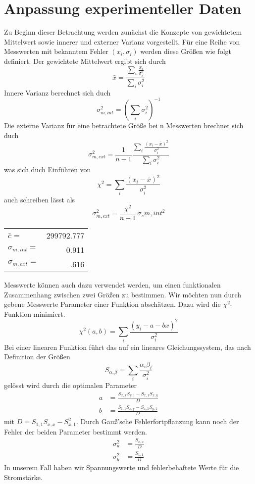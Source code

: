 \documentclass[12pt]{article}
\begin{document}
\section{Anpassung experimenteller Daten}
Zu Beginn dieser Betrachtung werden zunächst die Konzepte von gewichtetem Mittelwert sowie innerer und externer Varianz vorgestellt. Für eine Reihe von Messwerten mit bekanntem Fehler $(x_i,\sigma_i)$ werden diese Größen wie folgt definiert.
Der gewichtete Mittelwert ergibt sich durch
$$\bar{x}=\frac{\sum_i\frac{x_i}{\sigma_i^2}}{\sum_i\sigma_i^2}$$
Innere Varianz berechnet sich duch
$$\sigma_{m,int}^2=(\sum_i\sigma_i^2)^{-1}$$
Die externe Varianz für eine betrachtete Größe bei n Messwerten brechnet sich duch
$$\sigma_{m,ext}^2=\frac{1}{n-1}\frac{\sum_i\frac{(x_i-\bar{x})^2}{\sigma_i^2}}{\sum_i\sigma_i^2}$$
was sich duch Einführen von
$$\chi ^2=\sum_i\frac{(x_i-\bar{x})^2}{\sigma_i^2}$$
auch schreiben lässt als
$$\sigma_{m,ext}^2=\frac{\chi ^2}{n-1}\,\sigma_s{m,int}^2$$
\begin{table}[H]\begin{tabular}{l r}
    $\bar{c}=$&299792.777\\
    $\sigma_{m,int}=$&0.911\\
    $\sigma_{m,ext}=$&.616
\end{tabular}\end{table}
Messwerte können auch dazu verwendet werden, um einen funktionalen Zusammenhang zwischen zwei Größen zu bestimmen. Wir möchten nun durch gebene Messwerte Parameter einer Funktion abschätzen. Dazu wird die $\chi^2$-Funktion minimiert. 
$$\chi^2(a,b)=\sum_i\frac{(y_i-a-bx)^2}{\sigma_i^2}$$
Bei einer linearen Funktion führt das auf ein lineares Gleichungssystem, das nach Definition der Größen
$$S_{\alpha,\beta}=\sum_i\frac{\alpha_i\beta_i}{\sigma_i^2}$$
gelösst wird durch die optimalen Parameter
\begin{align*}
    a &= \frac{S_{x,x}S_{y,1}-S_{x,1}S_{x,y}}{D}\\
    b &= \frac{S_{1,1}S_{x,y}-S_{x,1}S_{y,1}}{D}
\end{align*}
mit $D=S_{1,1}S_{x,x}-S_{x,1}^2$. Durch Gauß'sche Fehlerfortpflanzung kann noch der Fehler der beiden Parameter bestimmt werden.
\begin{align*}
    \sigma_a^2 &= \frac{S_{x,x}}{D}\\
    \sigma_b^2 &= \frac{S_{1,1}}{D}
\end{align*}
In unserem Fall haben wir Spannungswerte und fehlerbehaftete Werte für die Stromstärke.

\end{document}
